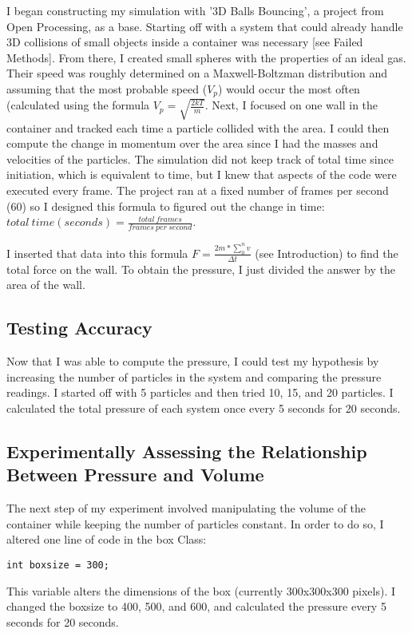 \documentclass[]{article}
\begin{document}
I began constructing my simulation with '3D Balls Bouncing', a project
from Open Processing, as a base. Starting off with a system that could
already handle 3D collisions of small objects inside a container was
necessary {[}see Failed Methods{]}. From there, I created small spheres
with the properties of an ideal gas. Their speed was roughly determined
on a Maxwell-Boltzman distribution and assuming that the most probable
speed ($V_{p}$) would occur the most often (calculated using the formula
$V_{p} = \sqrt{\frac{2kT}{m}}$. Next, I focused on one wall in the
container and tracked each time a particle collided with the area. I
could then compute the change in momentum over the area since I had the
masses and velocities of the particles. The simulation did not keep
track of total time since initiation, which is equivalent to time, but I
knew that aspects of the code were executed every frame. The project ran
at a fixed number of frames per second (60) so I designed this formula
to figured out the change in time:
$total\ time (seconds) = \frac{total\ frames}{frames\ per\ second}$.

I inserted that data into this formula
$F = \frac{2m * \displaystyle\sum\limits_{0}^n v}{\Delta t}$ (see
Introduction) to find the total force on the wall. To obtain the
pressure, I just divided the answer by the area of the wall.

\subsection{Testing Accuracy}

Now that I was able to compute the pressure, I could test my hypothesis
by increasing the number of particles in the system and comparing the
pressure readings. I started off with 5 particles and then tried 10, 15,
and 20 particles. I calculated the total pressure of each system once
every 5 seconds for 20 seconds.

\subsection{Experimentally Assessing the Relationship Between Pressure
and Volume}

The next step of my experiment involved manipulating the volume of the
container while keeping the number of particles constant. In order to do
so, I altered one line of code in the box Class:

\texttt{int boxsize = 300;}

This variable alters the dimensions of the box (currently 300x300x300
pixels). I changed the boxsize to 400, 500, and 600, and calculated the
pressure every 5 seconds for 20 seconds.
\end{document}

